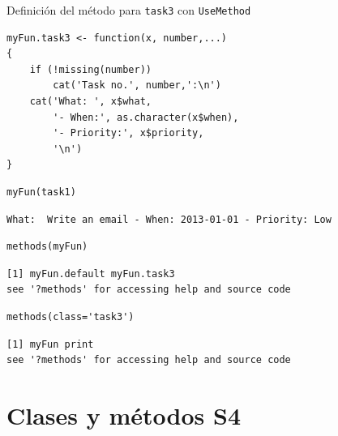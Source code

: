 \documentclass[xcolor={usenames,svgnames,dvipsnames}]{beamer}
\begin{document}
\begin{frame}[fragile,label={sec:orgheadline18}]{Definición del método para \texttt{task3} con \texttt{UseMethod}}
 \lstset{language=R,label= ,caption= ,captionpos=b,numbers=none}
\begin{lstlisting}
myFun.task3 <- function(x, number,...)
{
    if (!missing(number))
        cat('Task no.', number,':\n')
    cat('What: ', x$what,
        '- When:', as.character(x$when),
        '- Priority:', x$priority,
        '\n')
}
\end{lstlisting}

\lstset{language=R,label= ,caption= ,captionpos=b,numbers=none}
\begin{lstlisting}
myFun(task1)
\end{lstlisting}

\begin{verbatim}
What:  Write an email - When: 2013-01-01 - Priority: Low
\end{verbatim}

\lstset{language=R,label= ,caption= ,captionpos=b,numbers=none}
\begin{lstlisting}
methods(myFun)
\end{lstlisting}

\begin{verbatim}
[1] myFun.default myFun.task3  
see '?methods' for accessing help and source code
\end{verbatim}

\lstset{language=R,label= ,caption= ,captionpos=b,numbers=none}
\begin{lstlisting}
methods(class='task3')
\end{lstlisting}

\begin{verbatim}
[1] myFun print
see '?methods' for accessing help and source code
\end{verbatim}
\end{frame}

\section{Clases y métodos S4}
\label{sec:orgheadline42}
\end{document}
